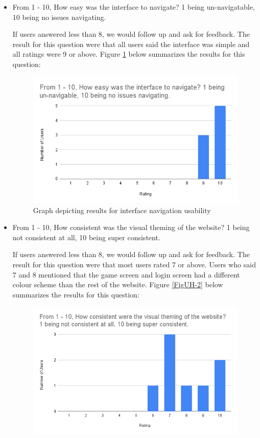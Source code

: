 \documentclass[12pt, titlepage]{article}
\begin{document}
\begin{itemize}
    \item From 1 - 10, How easy was the interface to navigate? 
    1 being un-navigatable, 10 being no issues navigating.

    If users answered less than 8, we would follow up and ask for feedback. The result for this question were that all users said the interface was simple and all ratings were 9 or above. Figure \ref{FigUH-1} below summarizes the results for this question:

    \begin{figure}[H]
    \centering
    \includegraphics[width=1\textwidth]{question1chart.png}
    
    \caption{Graph depicting results for interface navigation usability}
    
    \label{FigUH-1}
    \end{figure}

    \item From 1 - 10, How consistent was the visual theming of the website? 1 being not consistent at all, 10 being super consistent. 

    If users answered less than 8, we would follow up and ask for feedback. The result for this question were that most users rated 7 or above. Users who said 7 and 8 mentioned that the game screen and login screen had a different colour scheme than the rest of the website. Figure \ref{FigUH-2} below summarizes the results for this question:

    \begin{figure}[H]
    \centering
    \includegraphics[width=1\textwidth]{question2chart.png}
    

\end{figure}
\end{itemize}
\end{document}
